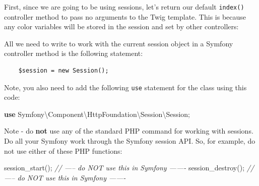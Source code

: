 \documentclass[a4paperpaper,openright]{book}
\newenvironment{Shaded}{}{}
\newcommand{\AnnotationTok}[1]{\textcolor[rgb]{0.38,0.63,0.69}{\textbf{\textit{#1}}}}
\newcommand{\CommentTok}[1]{\textcolor[rgb]{0.38,0.63,0.69}{\textit{#1}}}
\newcommand{\FunctionTok}[1]{\textcolor[rgb]{0.02,0.16,0.49}{#1}}
\newcommand{\KeywordTok}[1]{\textcolor[rgb]{0.00,0.44,0.13}{\textbf{#1}}}
\newcommand{\NormalTok}[1]{#1}
\newcommand{\OtherTok}[1]{\textcolor[rgb]{0.00,0.44,0.13}{#1}}
\newcommand{\StringTok}[1]{\textcolor[rgb]{0.25,0.44,0.63}{#1}}
\begin{document}
First, since we are going to be using sessions, let's return our default
\texttt{index()} controller method to pass no arguments to the Twig
template. This is because any color variables will be stored in the
session and set by other controllers:

\begin{Shaded}
\end{Shaded}

All we need to write to work with the current session object in a
Symfony controller method is the following statement:

\begin{verbatim}
    $session = new Session();
\end{verbatim}

Note, you also need to add the following \texttt{use} statement for the
class using this code:

\begin{Shaded}
\begin{Highlighting}[]
    \KeywordTok{use}\NormalTok{ Symfony\textbackslash{}Component\textbackslash{}HttpFoundation\textbackslash{}Session\textbackslash{}Session}\OtherTok{;}
\end{Highlighting}
\end{Shaded}

Note - do \textbf{not} use any of the standard PHP command for working
with sessions. Do all your Symfony work through the Symfony session API.
So, for example, do not use either of these PHP functions:

\begin{Shaded}
\begin{Highlighting}[]
    \FunctionTok{session_start}\OtherTok{();} \CommentTok{// ----- do NOT use this in Symfony -------}
    \FunctionTok{session_destroy}\OtherTok{();} \CommentTok{// ----- do NOT use this in Symfony -------}
\end{Highlighting}
\end{Shaded}
\end{document}
